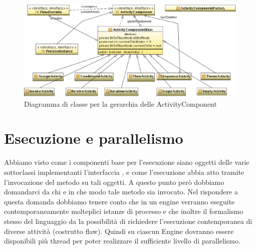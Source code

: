 \begin{figure}[p]
\begin{center}
\includegraphics[angle=90,scale=0.80]
{architettura_interna/dia/actclass}
\caption[Gerarchia delle ActivityComponent]{
   	\textsf{{\small Diagramma di classe per la gerarchia delle
   	ActivityComponent}} }
  \label{fig:actclass}
\end{center}
\end{figure}

\section{Esecuzione e parallelismo}
Abbiamo visto come i componenti base per l'esecuzione siano oggetti delle varie
sottoclassi implementanti l'interfaccia , e come
l'esecuzione abbia atto tramite l'invocazione del metodo
 su tali oggetti. A questo punto però dobbiamo
domandarci da chi e in che modo tale metodo sia invocato. Nel rispondere a questa
domanda dobbiamo tenere conto che in un engine verranno eseguite
contemporaneamente molteplici istanze di processo e che inoltre il formalismo
stesso del linguaggio da la possibilità di richiedere l'esecuzione contemporanea
di diverse attività (costrutto flaw). Quindi su ciascun Engine dovranno essere
disponibili più thread per poter realizzare il sufficiente livello di
parallelismo.

